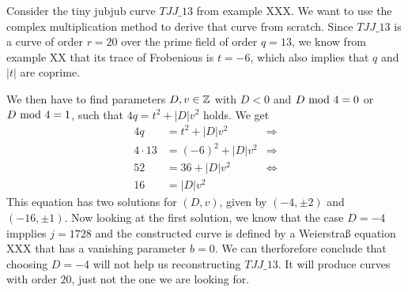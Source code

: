 \begin{example} Consider the tiny jubjub curve $\mathit{TJJ\_13}$ from example XXX. We want to use the complex multiplication method to derive that curve from scratch. Since $\mathit{TJJ\_13}$ is a curve of order $r=20$ over the prime field of order $q=13$, we know from example XX that its trace of Frobenious is $t=-6$, which also implies that $q$ and $|t|$ are coprime.

We then have to find parameters $D,v\in\mathbb{Z}$ with $D<0$ and $D \text{ mod } 4=0$ or $D \text{ mod } 4=1$, such that $4q = t^2+ |D|v^2$ holds. We get
\begin{align*}
4q & = t^2+ |D|v^2 & \Rightarrow \\
4\cdot 13 & = (-6)^2+ |D|v^2 & \Rightarrow \\
52 & = 36 + |D|v^2 & \Leftrightarrow \\
16 & = |D|v^2
\end{align*}
This equation has two solutions for $(D,v)$, given by $(-4,\pm 2)$ and $(-16,\pm 1)$. Now looking at the first solution, we know that the case $D=-4$ impplies $j=1728$ and the constructed curve is defined by a Weierstraß equation XXX that has a vanishing parameter $b=0$. We can therforefore conclude that choosing $D=-4$ will not help us reconstructing $\mathit{TJJ\_13}$. It will produce curves with order $20$, just not the one we are looking for.


\end{example}
